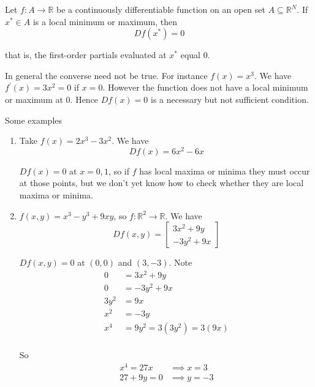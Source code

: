 \documentclass{article}
\begin{document}
\begin{theorem}
  Let $f: A \to \mathbb{R}$ be a continuously differentiable function on an open set $A \subseteq \mathbb{R}^N$. If $x^* \in A$ is a local minimum or maximum, then
  \[
    D f(x^*) = 0
  \]

  that is, the first-order partials evaluated at $x^*$ equal $0$.
\end{theorem}

\begin{remark}
  In general the converse need not be true. For instance $f(x) = x^3$. We have $f^\prime(x) = 3x^2 = 0$ if $x = 0$. However the function does not have a local minimum or maximum at $0$. Hence $D f(x) = 0$ is a necessary but not sufficient condition.
\end{remark}

Some examples
\begin{enumerate}
  \item Take $f(x) = 2x^3 - 3x^2$. We have
    \[
      D f(x) = 6x^2 - 6x
    \]

    $Df(x) = 0$ at $x = 0, 1$, so if $f$ has local maxima or minima they must occur at those points, but we don't yet know how to check whether they are local maxima or minima.

  \item $f(x, y) = x^3 - y^3 + 9xy$, so $f: \mathbb{R}^2 \to \mathbb{R}$. We have
    \[
      D f(x, y) = \left[\begin{matrix}
        3x^2 + 9y \\
        -3y^2 + 9x
      \end{matrix}\right]
    \]

    $Df(x, y) = 0$ at $(0, 0)$ and $(3, -3)$. Note
    \begin{align*}
      0    & = 3x^2 + 9y \\
      0    & = -3y^2 + 9x \\
      3y^2 & = 9x \\
      x^2  & = -3y \\
      x^4  & = 9y^2 = 3(3y^2) = 3(9x) \\
    \end{align*}

    So
    \begin{equation}
      \begin{array}{rcl}
      x^4     = 27x & \implies x = 3 \\
      27 + 9y = 0   & \implies y = -3
      \end{array}
      \nonumber
    \end{equation}
\end{enumerate}
\end{document}
